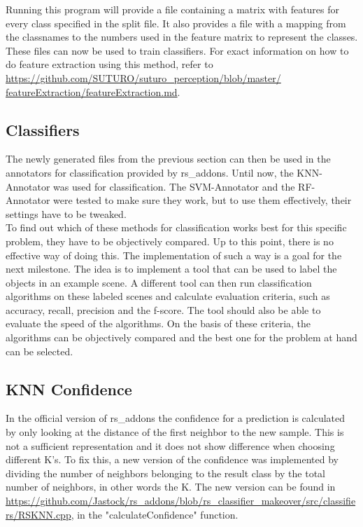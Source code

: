 \documentclass[main.tex]{subfiles}
\begin{document}
		     Running this program will provide a file containing a matrix with features for every class specified in the split file. It also provides a file with a 			mapping from the classnames to the numbers used in the feature matrix to represent the classes. These files can now be used to train classifiers. For 				exact information on how to do feature extraction using this method, refer to \url{https://github.com/SUTURO/suturo_perception/blob/master/							featureExtraction/featureExtraction.md}. 
			
			\subsection{Classifiers}
			The newly generated files from the previous section can then be used in the annotators for classification provided by rs\_addons. Until now, the KNN-					Annotator was used for classification. The SVM-Annotator and the RF-Annotator were tested to make sure they work, but to use them effectively, their 					settings have to be tweaked.\\
			
			To find out which of these methods for classification works best for this specific problem, they have to be objectively compared. Up to this point, 					there is no effective way of doing this. The implementation of such a way is a goal for the next milestone. The idea is to implement a tool that 						can be used to label the objects in an example scene. A different tool can then run classification algorithms on these labeled scenes and calculate 					evaluation criteria, such as accuracy, recall, precision and the f-score. The tool should also be able to evaluate the speed of the algorithms. On the 				basis of these criteria, the algorithms can be objectively compared and the best one for the problem at hand can be selected.
			
			\subsection{KNN Confidence}
			In the official version of rs\_addons the confidence for a prediction is calculated by only looking at the distance of the first neighbor to the new 					sample. This is not a sufficient representation and it does not show difference when choosing different K's. To fix this, a new version of the 						confidence was implemented by dividing the number of neighbors belonging to the result class by the total number of neighbors, in other words the K.
			The new version can be found in \url{https://github.com/Jastock/rs_addons/blob/rs_classifier_makeover/src/classifiers/RSKNN.cpp}, in the 								"calculateConfidence" function.  
			
\end{document}

